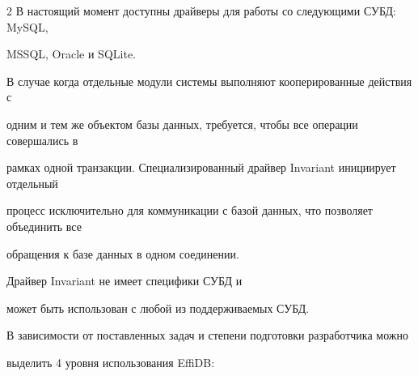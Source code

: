 \begin{multicols}{2}
В настоящий момент доступны драйверы для работы со следующими СУБД: MySQL, 

MSSQL, Oracle и SQLite.



В случае когда отдельные модули системы выполняют кооперированные действия с 

одним и тем же объектом базы данных, требуется, чтобы все операции совершались в 

рамках одной транзакции. Специализированный драйвер Invariant инициирует отдельный 

процесс исключительно для коммуникации с базой данных, что позволяет объединить все 

обращения к базе данных в одном соединении. 

Драйвер Invariant не имеет специфики СУБД и 

может быть использован с любой из поддерживаемых СУБД.



В зависимости от поставленных задач и степени подготовки разработчика можно 

выделить 4 уровня использования EffiDB:

\end{multicols}
